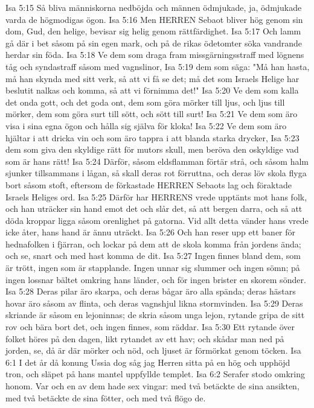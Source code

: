 Isa 5:15  Så bliva människorna nedböjda och männen ödmjukade, ja, ödmjukade varda de högmodigas ögon.
Isa 5:16  Men HERREN Sebaot bliver hög genom sin dom, Gud, den helige, bevisar sig helig genom rättfärdighet.
Isa 5:17  Och lamm gå där i bet såsom på sin egen mark, och på de rikas ödetomter söka vandrande herdar sin föda.
Isa 5:18  Ve dem som draga fram missgärningsstraff med lögnens tåg och syndastraff såsom med vagnslinor,
Isa 5:19  dem som säga: "Må han hasta, må han skynda med sitt verk, så att vi få se det; må det som Israels Helige har beslutit nalkas och komma, så att vi förnimma det!"
Isa 5:20  Ve dem som kalla det onda gott, och det goda ont, dem som göra mörker till ljus, och ljus till mörker, dem som göra surt till sött, och sött till surt!
Isa 5:21  Ve dem som äro visa i sina egna ögon och hålla sig själva för kloka!
Isa 5:22  Ve dem som äro hjältar i att dricka vin och som äro tappra i att blanda starka drycker,
Isa 5:23  dem som giva den skyldige rätt för mutors skull, men beröva den oskyldige vad som är hans rätt!
Isa 5:24  Därför, såsom eldsflamman förtär strå, och såsom halm sjunker tillsammans i lågan, så skall deras rot förruttna, och deras löv skola flyga bort såsom stoft, eftersom de förkastade HERREN Sebaots lag och föraktade Israels Heliges ord.
Isa 5:25  Därför har HERRENS vrede upptänts mot hans folk, och han uträcker sin hand emot det och slår det, så att bergen darra, och så att döda kroppar ligga såsom orenlighet på gatorna. Vid allt detta vänder hans vrede icke åter, hans hand är ännu uträckt.
Isa 5:26  Och han reser upp ett baner för hednafolken i fjärran, och lockar på dem att de skola komma från jordens ända; och se, snart och med hast komma de dit.
Isa 5:27  Ingen finnes bland dem, som är trött, ingen som är stapplande. Ingen unnar sig slummer och ingen sömn; på ingen lossnar bältet omkring hans länder, och för ingen brister en skorem sönder.
Isa 5:28  Deras pilar äro skarpa, och deras bågar äro alla spända; deras hästars hovar äro såsom av flinta, och deras vagnshjul likna stormvinden.
Isa 5:29  Deras skriande är såsom en lejoninnas; de skria såsom unga lejon, rytande gripa de sitt rov och bära bort det, och ingen finnes, som räddar.
Isa 5:30  Ett rytande över folket höres på den dagen, likt rytandet av ett hav; och skådar man ned på jorden, se, då är där mörker och nöd, och ljuset är förmörkat genom töcken.
Isa 6:1  I det år då konung Ussia dog såg jag Herren sitta på en hög och upphöjd tron, och släpet på hans mantel uppfyllde templet.
Isa 6:2  Serafer stodo omkring honom. Var och en av dem hade sex vingar: med två betäckte de sina ansikten, med två betäckte de sina fötter, och med två flögo de.
